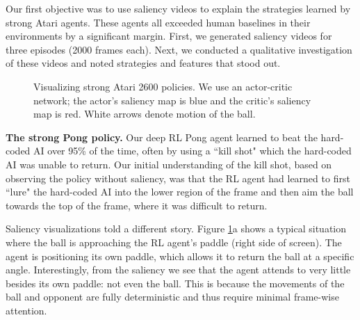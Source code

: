 \documentclass{article}
\begin{document}
Our first objective was to use saliency videos to explain the strategies learned by strong Atari agents. These agents all exceeded human baselines in their environments by a significant margin. First, we generated saliency videos for three episodes (2000 frames each). Next, we conducted a qualitative investigation of these videos and noted strategies and features that stood out.

\begin{figure}[h!]
\begin{centering}

\hspace{0.15cm}

\hspace{0.15cm}

\hspace{0.15cm}

\end{centering}
\caption{Visualizing strong Atari 2600 policies. We use an actor-critic network; the actor's saliency map is blue and the critic's saliency map is red. White arrows denote motion of the ball.}
\label{fig:strong}
\end{figure}

\textbf{The strong Pong policy.} Our deep RL Pong agent learned to beat the hard-coded AI over 95\% of the time, often by using a ``kill shot" which the hard-coded AI was unable to return. Our initial understanding of the kill shot, based on observing the policy without saliency, was that the RL agent had learned to first ``lure" the hard-coded AI into the lower region of the frame and then aim the ball towards the top of the frame, where it was difficult to return.

Saliency visualizations told a different story. Figure \ref{fig:strong}a shows a typical situation where the ball is approaching the RL agent's paddle (right side of screen). The agent is positioning its own paddle, which allows it to return the ball at a specific angle. Interestingly, from the saliency we see that the agent attends to very little besides its own paddle: not even the ball. This is because the movements of the ball and opponent are fully deterministic and thus require minimal frame-wise attention. 
\end{document}

